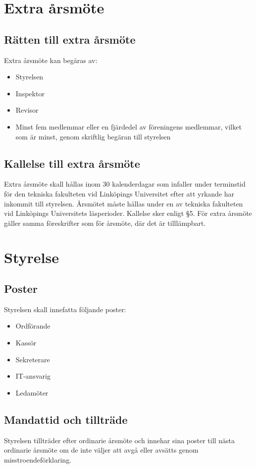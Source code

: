 \documentclass[11pt,a4paper]{article}
\begin{document}
\section{Extra årsmöte}

\subsection{Rätten till extra årsmöte}
Extra årsmöte kan begäras av:
\begin{itemize}
\item Styrelsen
\item Inspektor
\item Revisor
\item Minst fem medlemmar eller en fjärdedel av föreningens medlemmar,
vilket som är minst, genom skriftlig begäran till styrelsen
\end{itemize}
\subsection{Kallelse till extra årsmöte}
Extra årsmöte skall hållas inom 30 kalenderdagar som infaller under
terminstid för den tekniska fakulteten vid Linköpings Universitet efter
att yrkande har inkommit till styrelsen. Årsmötet måste hållas under en av
tekniska fakulteten vid Linköpings Universitets läsperioder. Kallelse sker
enligt \S5. För extra årsmöte gäller samma föreskrifter som för årsmöte, där
det är tilllämpbart.



\section{Styrelse}

\subsection{Poster}
Styrelsen skall innefatta följande poster:
\begin{itemize}
\item Ordförande
\item Kassör
\item Sekreterare
\item IT-ansvarig
\item Ledamöter
\end{itemize}
\subsection{Mandattid och tillträde}
Styrelsen tillträder efter ordinarie årsmöte och innehar sina poster till
nästa ordinarie årsmöte om de inte väljer att avgå eller avsätts genom
misstroendeförklaring.
\end{document}
